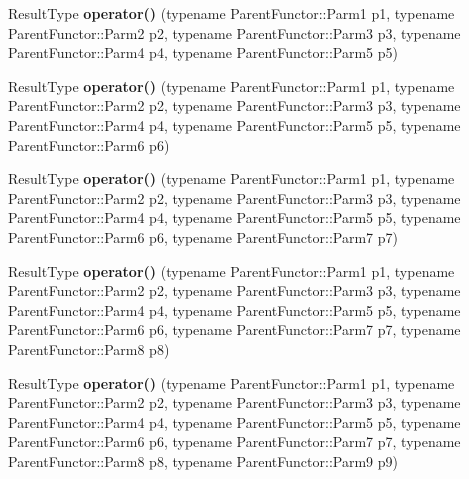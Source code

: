 \begin{DoxyCompactItemize}
\item 
\hypertarget{classutilspp_1_1FunctorHandler_aceecbbdc3e511628bf8dfc9b2e793a78}{Result\-Type {\bfseries operator()} (typename Parent\-Functor\-::\-Parm1 p1, typename Parent\-Functor\-::\-Parm2 p2, typename Parent\-Functor\-::\-Parm3 p3, typename Parent\-Functor\-::\-Parm4 p4, typename Parent\-Functor\-::\-Parm5 p5)}\label{classutilspp_1_1FunctorHandler_aceecbbdc3e511628bf8dfc9b2e793a78}

\item 
\hypertarget{classutilspp_1_1FunctorHandler_a3e690c68eafd010febde6d2e187434e0}{Result\-Type {\bfseries operator()} (typename Parent\-Functor\-::\-Parm1 p1, typename Parent\-Functor\-::\-Parm2 p2, typename Parent\-Functor\-::\-Parm3 p3, typename Parent\-Functor\-::\-Parm4 p4, typename Parent\-Functor\-::\-Parm5 p5, typename Parent\-Functor\-::\-Parm6 p6)}\label{classutilspp_1_1FunctorHandler_a3e690c68eafd010febde6d2e187434e0}

\item 
\hypertarget{classutilspp_1_1FunctorHandler_a7e89906c96d718119105f5cfa413e030}{Result\-Type {\bfseries operator()} (typename Parent\-Functor\-::\-Parm1 p1, typename Parent\-Functor\-::\-Parm2 p2, typename Parent\-Functor\-::\-Parm3 p3, typename Parent\-Functor\-::\-Parm4 p4, typename Parent\-Functor\-::\-Parm5 p5, typename Parent\-Functor\-::\-Parm6 p6, typename Parent\-Functor\-::\-Parm7 p7)}\label{classutilspp_1_1FunctorHandler_a7e89906c96d718119105f5cfa413e030}

\item 
\hypertarget{classutilspp_1_1FunctorHandler_a0a76f5205c35d55636601169e7a8d482}{Result\-Type {\bfseries operator()} (typename Parent\-Functor\-::\-Parm1 p1, typename Parent\-Functor\-::\-Parm2 p2, typename Parent\-Functor\-::\-Parm3 p3, typename Parent\-Functor\-::\-Parm4 p4, typename Parent\-Functor\-::\-Parm5 p5, typename Parent\-Functor\-::\-Parm6 p6, typename Parent\-Functor\-::\-Parm7 p7, typename Parent\-Functor\-::\-Parm8 p8)}\label{classutilspp_1_1FunctorHandler_a0a76f5205c35d55636601169e7a8d482}

\item 
\hypertarget{classutilspp_1_1FunctorHandler_aae7f1882c3416f6297f6c732c4433c49}{Result\-Type {\bfseries operator()} (typename Parent\-Functor\-::\-Parm1 p1, typename Parent\-Functor\-::\-Parm2 p2, typename Parent\-Functor\-::\-Parm3 p3, typename Parent\-Functor\-::\-Parm4 p4, typename Parent\-Functor\-::\-Parm5 p5, typename Parent\-Functor\-::\-Parm6 p6, typename Parent\-Functor\-::\-Parm7 p7, typename Parent\-Functor\-::\-Parm8 p8, typename Parent\-Functor\-::\-Parm9 p9)}\label{classutilspp_1_1FunctorHandler_aae7f1882c3416f6297f6c732c4433c49}


\end{DoxyCompactItemize}
